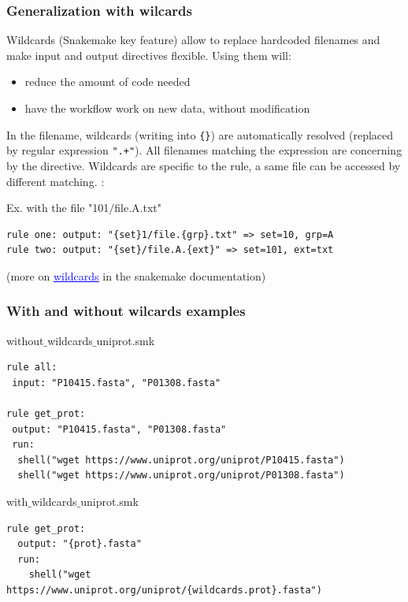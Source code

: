 \begin{frame}[containsverbatim]
\frametitle{Generalization with wilcards}
Wildcards (Snakemake key feature) allow to replace hardcoded filenames and make input and output directives flexible. Using them will:
\begin{itemize}
\item reduce the amount of code needed
\item have the workflow work on new data, without modification
\end{itemize}
\vfill
In the filename, wildcards (writing into \verb|{}|) are automatically resolved (replaced by regular expression \verb|".+"|). All filenames matching the expression are concerning by the directive.
Wildcards are specific to the rule, a same file can be accessed by different matching. :
\begin{block}{Ex. with the file "101$/$file.A.txt"}
\begin{lstlisting}
rule one: output: "{set}1/file.{grp}.txt" => set=10, grp=A
rule two: output: "{set}/file.A.{ext}" => set=101, ext=txt
\end{lstlisting}
\end{block}
\vfill
(more on \href{https://snakemake.readthedocs.io/en/stable/snakefiles/rules.html#wildcards}{\textcolor{blue}{\underline{wildcards}}} in the snakemake documentation)
\end{frame}
\begin{frame}[containsverbatim]
\frametitle{With and without wilcards examples}
\begin{block}{without$\_$wildcards$\_$uniprot.smk}
\begin{lstlisting}
rule all:
 input: "P10415.fasta", "P01308.fasta"

rule get_prot:
 output: "P10415.fasta", "P01308.fasta"
 run:
  shell("wget https://www.uniprot.org/uniprot/P10415.fasta")
  shell("wget https://www.uniprot.org/uniprot/P01308.fasta")
\end{lstlisting}
\end{block}
%
\begin{block}{with$\_$wildcards$\_$uniprot.smk}
\begin{lstlisting}
rule get_prot:
  output: "{prot}.fasta"
  run:
    shell("wget https://www.uniprot.org/uniprot/{wildcards.prot}.fasta")
\end{lstlisting}
\end{block}
\end{frame}
